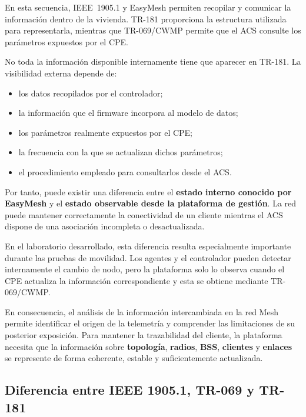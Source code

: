 En esta secuencia, IEEE~1905.1 y EasyMesh permiten recopilar y comunicar
la información dentro de la vivienda. TR-181 proporciona la estructura
utilizada para representarla, mientras que TR-069/CWMP permite que el ACS
consulte los parámetros expuestos por el CPE.

No toda la información disponible internamente tiene que aparecer en
TR-181. La visibilidad externa depende de:

\begin{itemize}
    \item los datos recopilados por el controlador;
    \item la información que el firmware incorpora al modelo de datos;
    \item los parámetros realmente expuestos por el CPE;
    \item la frecuencia con la que se actualizan dichos parámetros;
    \item el procedimiento empleado para consultarlos desde el ACS.
\end{itemize}

Por tanto, puede existir una diferencia entre el
\textbf{estado interno conocido por EasyMesh} y el
\textbf{estado observable desde la plataforma de gestión}. La red puede
mantener correctamente la conectividad de un cliente mientras el ACS
dispone de una asociación incompleta o desactualizada.

En el laboratorio desarrollado, esta diferencia resulta especialmente
importante durante las pruebas de movilidad. Los agentes y el controlador
pueden detectar internamente el cambio de nodo, pero la plataforma solo
lo observa cuando el CPE actualiza la información correspondiente y esta
se obtiene mediante TR-069/CWMP.

En consecuencia, el análisis de la información intercambiada en la red
Mesh permite identificar el origen de la telemetría y comprender las
limitaciones de su posterior exposición. Para mantener la trazabilidad
del cliente, la plataforma necesita que la información sobre
\textbf{topología}, \textbf{radios}, \textbf{BSS},
\textbf{clientes} y \textbf{enlaces} se represente de forma coherente,
estable y suficientemente actualizada.

\subsection{Diferencia entre IEEE 1905.1, TR-069 y TR-181}
\label{subsec:diferencia-ieee1905-tr069-tr181}

